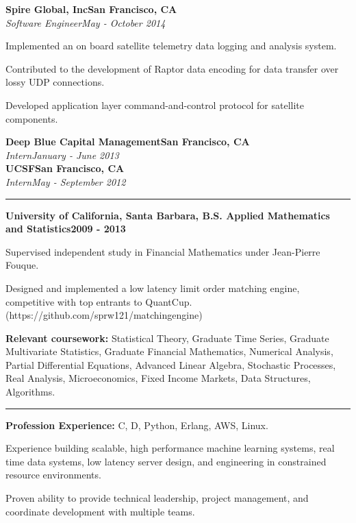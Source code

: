 \documentclass{article}
\newcommand{\ressection}[1]{\noindent{\large\textbf{#1}}\vspace{2pt}\hrule\vspace{4pt}}
\newcommand{\leftandright}[2]{\noindent\textbf{#1}\hfill\textbf{#2}}
\newcommand{\leftandrighti}[2]{\indent\textit{#1}\hfill\textit{#2}}
\begin{document}
\leftandright{Spire Global, Inc}{San Francisco, CA} \\
\leftandrighti{Software Engineer}{May - October 2014}

\begin{itemize*}
\item Implemented an on board satellite telemetry data logging and analysis system.
\item Contributed to the development of Raptor data encoding for data transfer over
  lossy UDP connections.
\item Developed application layer command-and-control protocol for satellite components.
\end{itemize*}

\leftandright{Deep Blue Capital Management}{San Francisco, CA} \\
\leftandrighti{Intern}{January - June 2013}\\

\leftandright{UCSF}{San Francisco, CA} \\
\leftandrighti{Intern}{May - September 2012}

\ressection{Education}

\leftandright{University of California, Santa Barbara, \textmd{B.S. Applied
    Mathematics and Statistics}}{2009 - 2013}
\begin{itemize*}
\item Supervised independent study in Financial Mathematics under Jean-Pierre Fouque.
\item Designed and implemented a low latency limit order matching engine,
  competitive with top entrants to QuantCup.
  (https://github.com/sprw121/matching\textunderscore engine)
\item \textbf{Relevant coursework:} Statistical Theory, Graduate Time Series,
  Graduate Multivariate Statistics, Graduate Financial Mathematics,
  Numerical Analysis, Partial Differential Equations,
  Advanced Linear Algebra, Stochastic Processes, Real Analysis,
  Microeconomics, Fixed Income Markets, Data Structures, Algorithms.
\end{itemize*}

\vspace{1.0em}

\vspace{1.0em}

\ressection{Skills}

\begin{itemize*}
\item \textbf{Profession Experience:} C, D, Python, Erlang, AWS, Linux.
\item Experience building scalable, high performance machine learning systems,
  real time data systems, low latency server design, and engineering in
  constrained resource environments.
\item Proven ability to provide technical leadership, project management,
  and coordinate development with multiple teams.
\end{itemize*}
\end{document}
